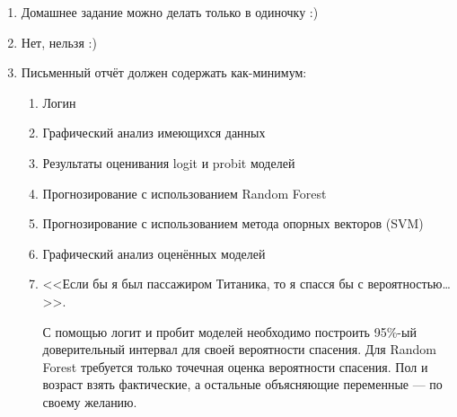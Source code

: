 \documentclass[pdftex,12pt,a4paper]{article}
\begin{document}
\begin{enumerate}
\item Домашнее задание можно делать только в одиночку :)
\item Нет, нельзя :)
\item Письменный отчёт  должен содержать как-минимум:
\begin{enumerate}
\item Логин 
\item Графический анализ имеющихся данных
\item Результаты оценивания logit и probit моделей
\item Прогнозирование с использованием Random Forest
\item Прогнозирование с использованием метода опорных векторов (SVM)
\item Графический анализ оценённых моделей
\item <<Если бы я был пассажиром Титаника, то я спасся бы с вероятностью\ldots>>. 

С помощью логит и пробит моделей необходимо построить 95\%-ый доверительный интервал для своей вероятности спасения. Для Random Forest требуется только точечная оценка вероятности спасения. Пол и возраст взять фактические, а остальные объясняющие переменные --- по своему желанию.
\end{enumerate}
\end{enumerate}



 
\end{document}
